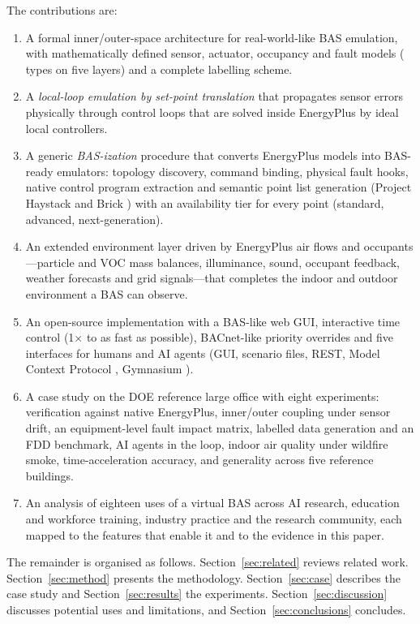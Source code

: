 \documentclass[preprint,12pt,authoryear=false]{elsarticle}
\begin{document}
The contributions are:
\begin{enumerate}
\item A formal inner/outer-space architecture for real-world-like BAS emulation, with mathematically defined sensor,
actuator, occupancy and fault models (\NumFaultTypes{} types on five layers) and a complete labelling scheme.
\item A \emph{local-loop emulation by set-point translation} that propagates sensor errors physically through control
loops that are solved inside EnergyPlus by ideal local controllers.
\item A generic \emph{BAS-ization} procedure that converts EnergyPlus models into BAS-ready emulators: topology
discovery, command binding, physical fault hooks, native control program extraction and semantic point list
generation (Project Haystack \cite{haystack} and Brick \cite{balaji2016brick}) with an availability tier for every
point (standard, advanced, next-generation).
\item An extended environment layer driven by EnergyPlus air flows and occupants---particle and VOC mass balances,
illuminance, sound, occupant feedback, weather forecasts and grid signals---that completes the indoor and outdoor
environment a BAS can observe.
\item An open-source implementation with a BAS-like web GUI, interactive time control (1$\times$ to as fast as
possible), BACnet-like priority overrides and five interfaces for humans and AI agents (GUI, scenario files, REST,
Model Context Protocol \cite{mcp2024}, Gymnasium \cite{towers2024gymnasium}).
\item A case study on the DOE reference large office \cite{deru2011reference} with eight experiments: verification
against native EnergyPlus, inner/outer coupling under sensor drift, an equipment-level fault impact matrix, labelled
data generation and an FDD benchmark, AI agents in the loop, indoor air quality under wildfire smoke, time-acceleration
accuracy, and generality across five reference buildings.
\item An analysis of eighteen uses of a virtual BAS across AI research, education and workforce training, industry
practice and the research community, each mapped to the features that enable it and to the evidence in this paper.
\end{enumerate}

The remainder is organised as follows. Section~\ref{sec:related} reviews related work. Section~\ref{sec:method}
presents the methodology. Section~\ref{sec:case} describes the case study and Section~\ref{sec:results} the
experiments. Section~\ref{sec:discussion} discusses potential uses and limitations, and Section~\ref{sec:conclusions}
concludes.
\end{document}
